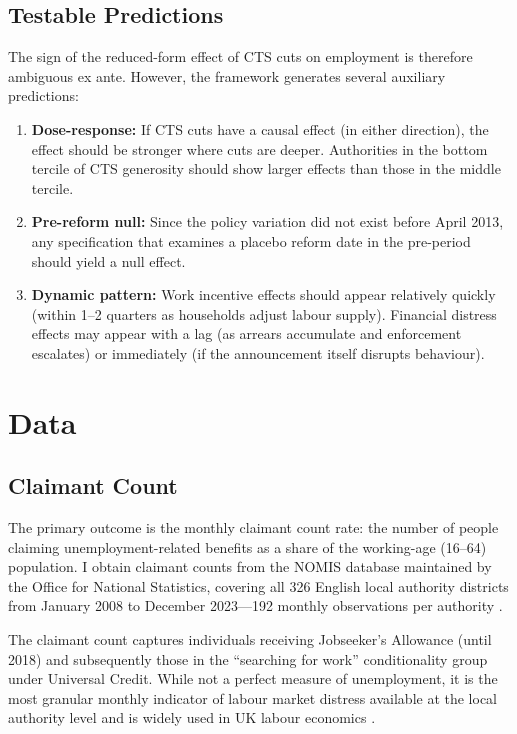 \documentclass[12pt]{article}
\begin{document}
\subsection{Testable Predictions}

The sign of the reduced-form effect of CTS cuts on employment is therefore ambiguous ex ante. However, the framework generates several auxiliary predictions:

\begin{enumerate}
\item \textbf{Dose-response:} If CTS cuts have a causal effect (in either direction), the effect should be stronger where cuts are deeper. Authorities in the bottom tercile of CTS generosity should show larger effects than those in the middle tercile.

\item \textbf{Pre-reform null:} Since the policy variation did not exist before April 2013, any specification that examines a placebo reform date in the pre-period should yield a null effect.

\item \textbf{Dynamic pattern:} Work incentive effects should appear relatively quickly (within 1--2 quarters as households adjust labour supply). Financial distress effects may appear with a lag (as arrears accumulate and enforcement escalates) or immediately (if the announcement itself disrupts behaviour).
\end{enumerate}



\section{Data}

\subsection{Claimant Count}

The primary outcome is the monthly claimant count rate: the number of people claiming unemployment-related benefits as a share of the working-age (16--64) population. I obtain claimant counts from the NOMIS database maintained by the Office for National Statistics, covering all 326 English local authority districts from January 2008 to December 2023---192 monthly observations per authority \citep{ons2023nomis}.

The claimant count captures individuals receiving Jobseeker's Allowance (until 2018) and subsequently those in the ``searching for work'' conditionality group under Universal Credit. While not a perfect measure of unemployment, it is the most granular monthly indicator of labour market distress available at the local authority level and is widely used in UK labour economics \citep{gregg2005proportion, manning2014coase}.
\end{document}
